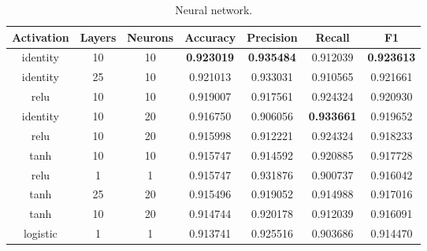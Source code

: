 \begin{appendices}
\begin{table}[ht]
\bigskip
\begin{subtable}{\textwidth}
\begin{adjustbox}{minipage=15cm, center}
\centering
\begin{tabular*}{\textwidth }{c @{\extracolsep{\fill}} cccccc}
\toprule
Activation & Layers & Neurons &  Accuracy &  Precision &    Recall &        F1 \\
\midrule
identity   & 10     &      10 &  \textbf{0.923019} &   \textbf{0.935484} &  0.912039 &  \textbf{0.923613} \\
identity   & 25     &      10 &  0.921013 &   0.933031 &  0.910565 &  0.921661 \\
relu       & 10     &      10 &  0.919007 &   0.917561 &  0.924324 &  0.920930 \\
identity   & 10     &      20 &  0.916750 &   0.906056 &  \textbf{0.933661} &  0.919652 \\
relu       & 10     &      20 &  0.915998 &   0.912221 &  0.924324 &  0.918233 \\
tanh       & 10     &      10 &  0.915747 &   0.914592 &  0.920885 &  0.917728 \\
relu       & 1      &       1 &  0.915747 &   0.931876 &  0.900737 &  0.916042 \\
tanh       & 25     &      20 &  0.915496 &   0.919052 &  0.914988 &  0.917016 \\
tanh       & 10     &      20 &  0.914744 &   0.920178 &  0.912039 &  0.916091 \\
logistic   & 1      &       1 &  0.913741 &   0.925516 &  0.903686 &  0.914470 \\
\bottomrule
\end{tabular*}
\caption{Neural network.}
\label{tab:Neural network}
\end{adjustbox}
\end{subtable}
\end{table}
\clearpage

\begin{table}[ht]
\captionsetup[subtable]{labelformat=empty}
\begin{subtable}{\textwidth}
\ContinuedFloat
\begin{adjustbox}{minipage=15cm, center}
\centering
\begin{tabular*}{\textwidth}{c @{\extracolsep{\fill}} ccccc}


\end{tabular*}
\end{adjustbox}
\end{subtable}
\end{table}
\end{appendices}
